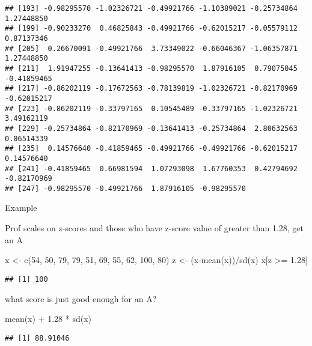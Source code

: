 \documentclass[
]{book}
\newenvironment{Shaded}{\begin{snugshade}}{\end{snugshade}}
\newcommand{\DecValTok}[1]{\textcolor[rgb]{0.00,0.00,0.81}{#1}}
\newcommand{\FloatTok}[1]{\textcolor[rgb]{0.00,0.00,0.81}{#1}}
\newcommand{\FunctionTok}[1]{\textcolor[rgb]{0.00,0.00,0.00}{#1}}
\newcommand{\NormalTok}[1]{#1}
\newcommand{\OtherTok}[1]{\textcolor[rgb]{0.56,0.35,0.01}{#1}}
\newcommand{\SpecialCharTok}[1]{\textcolor[rgb]{0.00,0.00,0.00}{#1}}
\theoremstyle{definition}
\theoremstyle{definition}
\theoremstyle{definition}
\theoremstyle{definition}
\theoremstyle{remark}
\begin{document}
\begin{verbatim}
## [193] -0.98295570 -1.02326721 -0.49921766 -1.10389021 -0.25734864  1.27448850
## [199] -0.90233270  0.46825843 -0.49921766 -0.62015217 -0.05579112  0.87137346
## [205]  0.26670091 -0.49921766  3.73349022 -0.66046367 -1.06357871  1.27448850
## [211]  1.91947255 -0.13641413 -0.98295570  1.87916105  0.79075045 -0.41859465
## [217] -0.86202119 -0.17672563 -0.78139819 -1.02326721 -0.82170969 -0.62015217
## [223] -0.86202119 -0.33797165  0.10545489 -0.33797165 -1.02326721  3.49162119
## [229] -0.25734864 -0.82170969 -0.13641413 -0.25734864  2.80632563  0.06514339
## [235]  0.14576640 -0.41859465 -0.49921766 -0.49921766 -0.62015217  0.14576640
## [241] -0.41859465  0.66981594  1.07293098  1.67760353  0.42794692 -0.82170969
## [247] -0.98295570 -0.49921766  1.87916105 -0.98295570
\end{verbatim}

Example

Prof scales on z-scores and those who have z-score value of greater than 1.28, get an A

\begin{Shaded}
\begin{Highlighting}[]
\NormalTok{x }\OtherTok{\textless{}{-}} \FunctionTok{c}\NormalTok{(}\DecValTok{54}\NormalTok{, }\DecValTok{50}\NormalTok{, }\DecValTok{79}\NormalTok{, }\DecValTok{79}\NormalTok{, }\DecValTok{51}\NormalTok{, }\DecValTok{69}\NormalTok{, }\DecValTok{55}\NormalTok{, }\DecValTok{62}\NormalTok{, }\DecValTok{100}\NormalTok{, }\DecValTok{80}\NormalTok{)}
\NormalTok{z }\OtherTok{\textless{}{-}}\NormalTok{ (x}\SpecialCharTok{{-}}\FunctionTok{mean}\NormalTok{(x))}\SpecialCharTok{/}\FunctionTok{sd}\NormalTok{(x)}
\NormalTok{x[z }\SpecialCharTok{\textgreater{}=} \FloatTok{1.28}\NormalTok{]}
\end{Highlighting}
\end{Shaded}

\begin{verbatim}
## [1] 100
\end{verbatim}

what score is just good enough for an A?

\begin{Shaded}
\begin{Highlighting}[]
\FunctionTok{mean}\NormalTok{(x) }\SpecialCharTok{+} \FloatTok{1.28} \SpecialCharTok{*} \FunctionTok{sd}\NormalTok{(x)}
\end{Highlighting}
\end{Shaded}

\begin{verbatim}
## [1] 88.91046
\end{verbatim}
\end{document}
